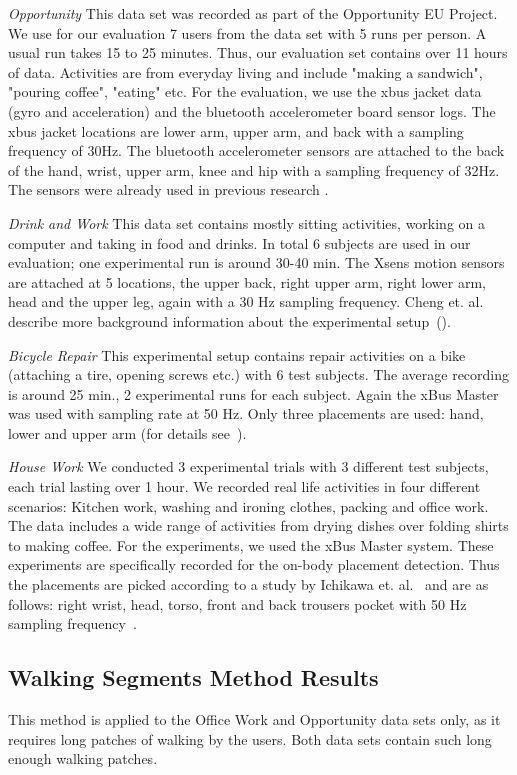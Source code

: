 \emph{Opportunity} This data set was recorded as part of the
Opportunity EU Project. We use for our evaluation  7 users from  the data set with 5
runs per person. A usual run takes 15 to 25 minutes.
Thus, our evaluation set contains over 11 hours of
data. Activities are from everyday living and include "making a
sandwich", "pouring coffee", "eating" etc.  For the evaluation, we use the xbus jacket data (gyro
and acceleration) and the bluetooth accelerometer board sensor logs.
The xbus jacket locations are lower arm, upper arm, and back with a
sampling frequency of 30Hz.  The bluetooth accelerometer sensors are
attached to the back of the hand, wrist, upper arm, knee and hip with
a sampling frequency of 32Hz. The sensors were already used in
previous research \cite{Bachlin:2009p10850}. 

\emph{Drink and Work} This data set contains mostly sitting
activities, working on a computer and taking in food and drinks.  In
total 6 subjects are used in our evaluation; one experimental run is
around 30-40 min.  The Xsens motion sensors are attached at 5
locations, the upper back, right upper arm, right lower arm, head and
the upper leg, again with a 30 Hz sampling frequency.
Cheng et. al. describe more background information about the experimental setup~(\cite{Cheng:2010p10269}).

\emph{Bicycle Repair} This experimental setup contains repair
activities on a bike (attaching a tire, opening screws etc.) with 6
test subjects. The average recording is around 25 min., 2 experimental
runs for each subject. Again the xBus Master was used with sampling
rate at 50 Hz.  Only three placements are used: hand, lower and upper arm
(for details see~\cite{Stiefmeier:2006p10710}).

\emph{House Work} We conducted 3 experimental trials with 3 different
test subjects, each trial lasting over 1 hour.  We recorded real life
activities in four different scenarios: Kitchen work, washing and
ironing clothes, packing and office work. The data includes a wide
range of activities from drying dishes over folding shirts to making
coffee.  For the experiments, we used the xBus Master system.  These 
experiments are specifically recorded for the on-body placement
detection. Thus the placements are picked according to a study by
Ichikawa et. al.~\cite{Ichikawa:2005p6295} and are as follows: right
wrist, head, torso, front and back trousers pocket with 50 Hz sampling
frequency~\cite{Kunze:2007p86}.



\subsection{Walking Segments Method Results}
This method is applied to the Office Work and Opportunity data sets
only, as it requires long patches of walking by the users. 
Both data sets contain such long enough walking patches.

